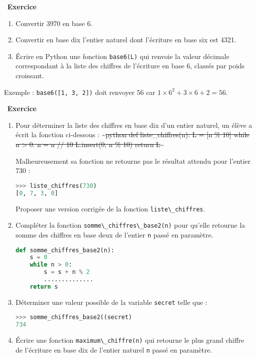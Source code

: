 \documentclass[
  11pt,
]{article}
\newcommand{\passthrough}[1]{#1}
\providecommand{\tightlist}{%
  \setlength{\itemsep}{0pt}\setlength{\parskip}{0pt}}
\newcounter{exo}
\newenvironment{exercice}[1]
{\par \medskip   \addtocounter{exo}{1} \noindent  
\begin{bclogo}[arrondi =0.1,   noborder = true, logo=\bccrayon, marge=4]{~\textbf{Exercice} \textbf{\theexo} {\itshape #1} }  \par}
{
\end{bclogo}
 \par \bigskip }
\newcounter{def}
\begin{document}
\begin{exercice}{}

\begin{enumerate}
\def\labelenumi{\arabic{enumi}.}
\tightlist
\item
  Convertir 3970 en base 6.
\item
  Convertir en base dix l'entier naturel dont l'écriture en base six est
  4321.
\item
  Écrire en Python une fonction \passthrough{\lstinline!base6(L)!} qui
  renvoie la valeur décimale correspondant à la liste des chiffres de
  l'écriture en base 6, classés par poids croissant.
\end{enumerate}

Exemple : \passthrough{\lstinline!base6([1, 3, 2])!} doit renvoyer 56
car \(1 \times 6^{2} + 3 \times 6 + 2 = 56\).

\end{exercice}

\begin{exercice}{}

\begin{enumerate}
\def\labelenumi{\arabic{enumi}.}
\item
  Pour déterminer la liste des chiffres en base dix d'un entier naturel,
  un élève a écrit la fonction ci-dessous :
  \textasciitilde{}\sout{python def liste\_chiffres(n): L = {[}n \%
  10{]} while n \textgreater{} 0: n = n // 10 L.insert(0, n \% 10)
  return L}\textasciitilde{}

  Malheureusement sa fonction ne retourne pas le résultat attendu pour
  l'entier \(730\) :

\begin{lstlisting}[language=Python]
>>> liste_chiffres(730)
[0, 7, 3, 0]
\end{lstlisting}

  Proposer une version corrigée de la fonction
  \passthrough{\lstinline!liste\_chiffres!}.
\item
  Compléter la fonction
  \passthrough{\lstinline!somme\_chiffres\_base2(n)!} pour qu'elle
  retourne la somme des chiffres en base deux de l'entier
  \passthrough{\lstinline!n!} passé en paramètre.

\begin{lstlisting}[language=Python]
def somme_chiffres_base2(n):
    s = 0
    while n > 0:
        s = s + n % 2
        ..............
    return s
\end{lstlisting}
\item
  Déterminer une valeur possible de la variable
  \passthrough{\lstinline!secret!} telle que :

\begin{lstlisting}[language=Python]
>>> somme_chiffres_base2((secret)
734
\end{lstlisting}
\item
  Écrire une fonction \passthrough{\lstinline!maximum\_chiffre(n)!} qui
  retourne le plus grand chiffre de l'écriture en base dix de l'entier
  naturel \passthrough{\lstinline!n!} passé en paramètre.
\end{enumerate}

\end{exercice}
\end{document}
